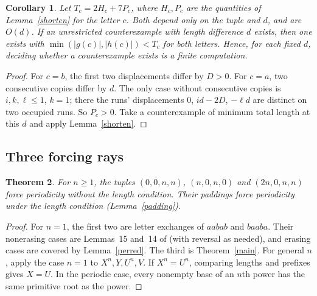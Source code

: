 \documentclass[11pt]{article}
\newtheorem{theorem}{Theorem}
\newtheorem{corollary}[theorem]{Corollary}
\theoremstyle{remark}\newtheorem*{remark}{Remark}
\begin{document}
\begin{corollary}\label{finite-d}
Let \(T_c=2H_c+7P_c\), where \(H_c,P_c\) are the quantities of Lemma~\ref{shorten} for the letter \(c\). Both depend only on the tuple and \(d\), and are \(O(d)\). If an unrestricted counterexample with length difference \(d\) exists, then one exists with \(\min(|g(c)|,|h(c)|)<T_c\) for both letters. Hence, for each fixed \(d\), deciding whether a counterexample exists is a finite computation.
\end{corollary}
\begin{proof}
For \(c=b\), the first two displacements differ by \(D>0\). For \(c=a\), two consecutive copies differ by \(d\). The only case without consecutive copies is \(i,k,\ell\le1\), \(k=1\); there the runs' displacements \(0\), \(id-2D\), \(-\ell d\) are distinct on two occupied runs. So \(P_c>0\). Take a counterexample of minimum total length at this \(d\) and apply Lemma~\ref{shorten}.
\end{proof}

\subsection{Three forcing rays}
\begin{theorem}\label{rays}
For \(n\ge1\), the tuples \((0,0,n,n)\), \((n,0,n,0)\) and \((2n,0,n,n)\) force periodicity without the length condition. Their paddings force periodicity under the length condition (Lemma~\ref{padding}).
\end{theorem}
\begin{proof}
For \(n=1\), the first two are letter exchanges of \(aabab\) and \(baaba\). Their nonerasing cases are Lemmas~15 and~14 of \cite{hs} (with reversal as needed), and erasing cases are covered by Lemma~\ref{perred}. The third is Theorem~\ref{main}. For general \(n\), apply the case \(n=1\) to \(X^n,Y,U^n,V\). If \(X^n=U^n\), comparing lengths and prefixes gives \(X=U\). In the periodic case, every nonempty base of an \(n\)th power has the same primitive root as the power.
\end{proof}
\end{document}
